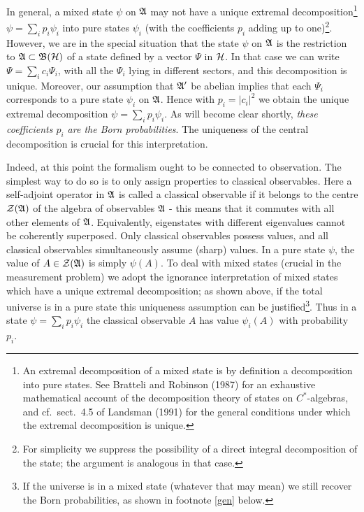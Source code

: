 \documentclass[12pt,titlepage]{article}
\newcommand{\ps}{\psi}
\newcommand{\A}{\frak A}
\newcommand{\B}{\frak B}
\renewcommand{\H}{\mbox{$\cal H$}}
\newcommand{\fn}{\footnote}
\newcommand{\Z}{{\cal Z}}
\begin{document}
In general, a mixed state $\ps$ on $\A$ may not have
 a unique extremal  decomposition\fn{An extremal  decomposition of a mixed
state is by definition a decomposition
into pure states. See Bratteli and Robinson (1987) for an exhaustive
mathematical account of the
decomposition theory of states on $C^*$-algebras, and cf.\ sect.\ 4.5 of
Landsman (1991) for the
general
 conditions under which the extremal decomposition is unique.}   $\psi=\sum_i
p_i \psi_i$ into pure
states $\psi_i$ (with the coefficients $p_i$ adding up to one)\fn{For
simplicity we suppress the
possibility of a direct integral decomposition of the state; the argument is
analogous in that
case.}.
  However,  we are in the special situation that the state $\ps$ on $\A$ is the
restriction to $\A\subset
\B(\H)$ of a  state defined by a vector $\Psi$ in $\H$.
In that case we can write $\Psi=\sum_i c_i\Psi_i$, with all the $\Psi_i$ lying
in different sectors,
 and this decomposition is unique. Moreover, our assumption that $\A'$ be
abelian implies that each
$\Psi_i$ corresponds to a pure state $\ps_i$ on $\A$.
 Hence with $p_i=|c_i|^2$ we obtain  the unique extremal decomposition
$\psi=\sum_i p_i \psi_i$.
 As will become clear shortly,  {\em
these coefficients $p_i$ are the Born probabilities}. The uniqueness of the
central decomposition is
crucial for this interpretation.

Indeed, at this point the formalism ought to be connected to observation. The
simplest way to do
so is to only assign properties to classical observables. Here a
  self-adjoint operator in $\A$ is called a classical observable if  it belongs
to the
centre $\Z(\A)$ of the algebra of observables $\A$ - this means that it
commutes with all other
elements of $\A$. Equivalently,
   eigenstates with different eigenvalues cannot be coherently superposed. Only
  classical
observables possess values, and all classical observables simultaneously assume
(sharp) values. In a
pure state $\ps$, the value of $A\in  \Z(\A)$ is simply $\ps(A)$.
To deal with mixed states (crucial in the measurement problem) we adopt the
ignorance interpretation
of mixed states which have a unique extremal decomposition; as shown above, if
the total universe is
in a pure state this uniqueness assumption can be justified\fn{If the universe
is in a mixed state
(whatever that may mean) we still recover the Born probabilities, as shown in
footnote \ref{gen}
below.}. Thus in a state
$\psi=\sum_i p_i \psi_i$ the classical observable $A$ has value $\ps_i(A)$ with
probability $p_i$.
\end{document}
